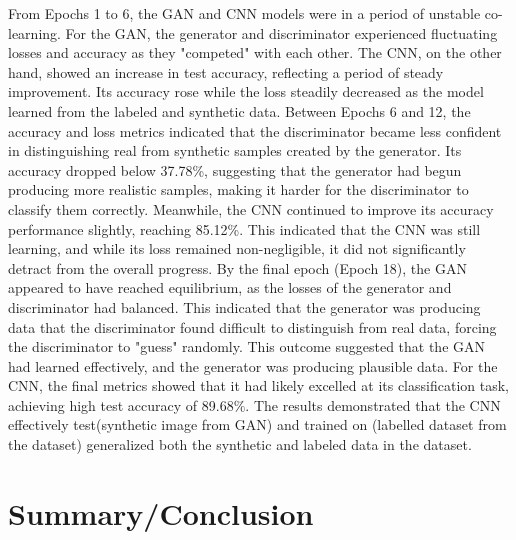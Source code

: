 \documentclass[12pt]{article}
\begin{document}
From Epochs 1 to 6, the GAN and CNN models were in a period of unstable co-learning. For the GAN, the generator and discriminator experienced fluctuating losses and accuracy as they "competed" with each other. The CNN, on the other hand, showed an increase in test accuracy, reflecting a period of steady improvement. Its accuracy rose while the loss steadily decreased as the model learned from the labeled and synthetic data.
Between Epochs 6 and 12, the accuracy and loss metrics indicated that the discriminator became less confident in distinguishing real from synthetic samples created by the generator. Its accuracy dropped below 37.78\%, suggesting that the generator had begun producing more realistic samples, making it harder for the discriminator to classify them correctly. Meanwhile, the CNN continued to improve its accuracy performance slightly, reaching 85.12\%. This indicated that the CNN was still learning, and while its loss remained non-negligible, it did not significantly detract from the overall progress.
By the final epoch (Epoch 18), the GAN appeared to have reached equilibrium, as the losses of the generator and discriminator had balanced. This indicated that the generator was producing data that the discriminator found difficult to distinguish from real data, forcing the discriminator to "guess" randomly. This outcome suggested that the GAN had learned effectively, and the generator was producing plausible data. For the CNN, the final metrics showed that it had likely excelled at its classification task, achieving high test accuracy of 89.68\%. The results demonstrated that the CNN effectively test(synthetic image from GAN) and trained on (labelled dataset from the dataset) generalized both the synthetic and labeled data in the dataset.


\section{Summary/Conclusion}
\end{document}
